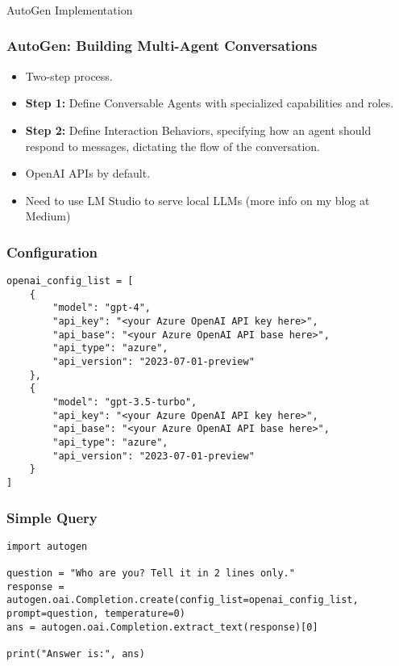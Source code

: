 \begin{frame}[fragile]\frametitle{}
\begin{center}
{\Large AutoGen Implementation}
\end{center}
\end{frame}


\begin{frame}[fragile]\frametitle{AutoGen: Building Multi-Agent Conversations}
  \begin{itemize}
    \item Two-step process.
    \item \textbf{Step 1:} Define Conversable Agents with specialized capabilities and roles.
    \item \textbf{Step 2:} Define Interaction Behaviors, specifying how an agent should respond to messages, dictating the flow of the conversation.
    \item OpenAI APIs by default.
	\item Need to use LM Studio to serve local LLMs (more info on my blog at Medium)
  \end{itemize}
\end{frame}

\begin{frame}[fragile]\frametitle{Configuration}
  \begin{lstlisting}
openai_config_list = [
    {
        "model": "gpt-4",
        "api_key": "<your Azure OpenAI API key here>",
        "api_base": "<your Azure OpenAI API base here>",
        "api_type": "azure",
        "api_version": "2023-07-01-preview"
    },
    {
        "model": "gpt-3.5-turbo",
        "api_key": "<your Azure OpenAI API key here>",
        "api_base": "<your Azure OpenAI API base here>",
        "api_type": "azure",
        "api_version": "2023-07-01-preview"
    }
]
  \end{lstlisting}
\end{frame}

\begin{frame}[fragile]\frametitle{Simple Query}
  \begin{lstlisting}
import autogen

question = "Who are you? Tell it in 2 lines only."
response = autogen.oai.Completion.create(config_list=openai_config_list, prompt=question, temperature=0)
ans = autogen.oai.Completion.extract_text(response)[0]

print("Answer is:", ans)
  \end{lstlisting}
\end{frame}


